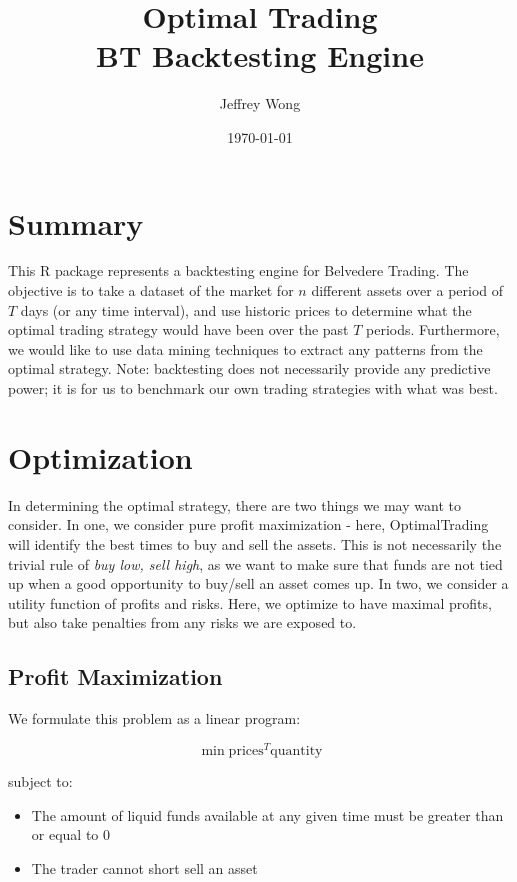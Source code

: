 \documentclass{article}
\title{Optimal Trading\\BT Backtesting Engine}
\author{Jeffrey Wong}
\date{\today}
\begin{document}
\maketitle


\section{Summary}

This R package represents a backtesting engine for Belvedere Trading.  The 
objective is to take a dataset of the market for $n$ different assets over
a period of $T$ days (or any time interval), and use historic prices to determine
what the optimal trading strategy would have been over the past $T$ periods.  
Furthermore, we would like to use data mining techniques to extract any patterns 
from the optimal strategy.  Note: backtesting does not necessarily provide any 
predictive power; it is for us to benchmark our own trading strategies with what 
was best.

\section{Optimization}

In determining the optimal strategy, there are two things we may want to
consider.  In one, we consider pure profit maximization - here, OptimalTrading
will identify the best times to buy and sell the assets.  This is not necessarily
the trivial rule of \textit{buy low, sell high}, as we want to make sure that
funds are not tied up when a good opportunity to buy/sell an asset comes up.
In two, we consider a utility function of profits and risks.  Here, we optimize
to have maximal profits, but also take penalties from any risks we are exposed to.

\subsection{Profit Maximization}

We formulate this problem as a linear program:

$$\min {\mathrm{prices}^T \mathrm{quantity}}$$

subject to:

\begin{itemize}
  \item The amount of liquid funds available at any given time must be greater
    than or equal to 0
  \item The trader cannot short sell an asset
\end{itemize}
\end{document}
